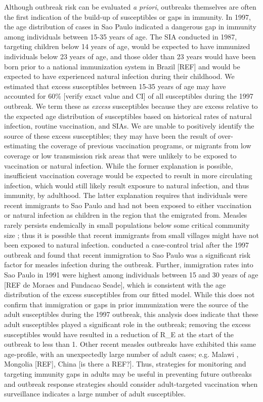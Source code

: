 Although outbreak risk can be evaluated \emph{a priori}, outbreaks themselves are often the first indication of the build-up of susceptibles or gaps in immunity. In 1997, the age distribution of cases in Sao Paulo indicated a dangerous gap in immunity among individuals between 15-35 years of
age. The SIA conducted in 1987, targeting children below 14 years of age, would be expected to have immunized individuals below 23 years of
age, and those older than 23 years would have been born prior to a national immunization system in Brazil {[}REF{]} and would be expected
to have experienced natural infection during their childhood. We estimated that excess susceptibles between 15-35 years of age may have accounted for 60\% {[}verify exact value and CI{]} of all susceptibles during the 1997 outbreak. We term these as \emph{excess} susceptibles because they are
excess relative to the expected age distribution of susceptibles based on historical rates of natural infection, routine vaccination, and SIAs. We are unable to positively identify the source of these excess susceptibles; they may have been the result of over-estimating the coverage of previous
vaccination programs, or migrants from low coverage or low transmission risk areas that were unlikely to be exposed to vaccination or natural infection. While the former explanation is possible, insufficient vaccination coverage would be expected to result in more circulating infection, which would still likely result exposure to natural infection, and thus immunity, by adulthood. The latter explanation requires that individuals were recent immigrants to Sao Paulo and had not been exposed to either vaccination or natural infection as children in the region that the emigrated from. Measles rarely persists endemically in small populations below some critical community size \cite{Conlan_2007, Keeling_1997}; thus it is possible that recent immigrants from small villages might have not been exposed to natural infection. \citet{Camargo_2000} conducted a case-control trial after the 1997 outbreak and found that recent immigration to Sao Paulo was a significant risk factor for measles infection during the outbreak. Further, immigration rates into Sao Paulo in 1991 were highest among individuals between 15 and 30 years of age  {[}REF de Moraes and Fundacao
Seade{]}, which is consistent with the age distribution of the excess
susceptibles from our fitted model. While this does not confirm that
immigration or gaps in prior immunization were the source of the adult
susceptibles during the 1997 outbreak, this analysis does indicate that
these adult susceptibles played a significant role in the outbreak;
removing the excess susceptibles would have resulted in a reduction of
R\_E at the start of the outbreak to less than 1. Other recent measles
outbreaks have exhibited this same age-profile, with an unexpectedly
large number of adult cases; e.g. Malawi \cite{Minetti_2013}, Mongolia
{[}REF{]}, China {[}is there a REF?{]}. Thus, strategies for monitoring
and targeting immunity gaps in adults may be useful in preventing future
outbreaks and outbreak response strategies should consider
adult-targeted vaccination when surveillance indicates a large number of
adult susceptibles.


